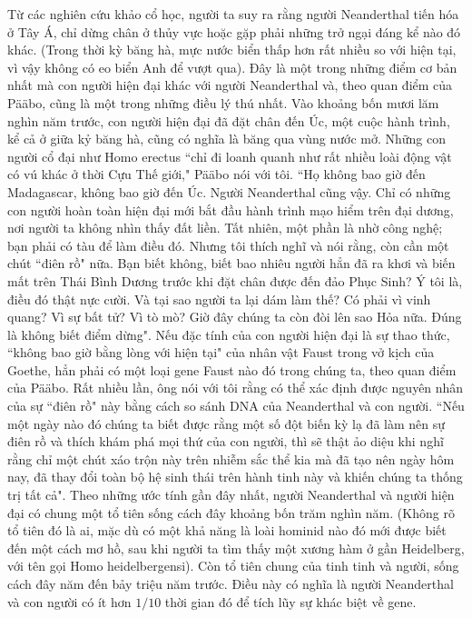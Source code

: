 \begin{multicols}{2}
	Từ các nghiên cứu khảo cổ học, người ta suy ra rằng người Neanderthal tiến hóa ở Tây Á, chỉ dừng chân ở thủy vực hoặc gặp phải những trở ngại đáng kể nào đó khác. (Trong thời kỳ băng hà, mực nước biển thấp hơn rất nhiều so với hiện tại, vì vậy không có eo biển Anh để vượt qua). Đây là một trong những điểm cơ bản nhất mà con người hiện đại khác với người Neanderthal và, theo quan điểm của Pääbo, cũng là một trong những điều lý thú nhất. Vào khoảng bốn mươi lăm nghìn năm trước, con người hiện đại đã đặt chân đến Úc, một cuộc hành trình, kể cả ở giữa kỷ băng hà, cũng có nghĩa là băng qua vùng nước mở. Những con người cổ đại như Homo erectus ``chỉ đi loanh quanh như rất nhiều loài động vật có vú khác ở thời Cựu Thế giới," Pääbo nói với tôi. ``Họ không bao giờ đến Madagascar, không bao giờ đến Úc. Người Neanderthal cũng vậy. Chỉ có những con người hoàn toàn hiện đại mới bắt đầu hành trình mạo hiểm trên đại dương, nơi người ta không nhìn thấy đất liền. Tất nhiên, một phần là nhờ công nghệ; bạn phải có tàu để làm điều đó. Nhưng tôi thích nghĩ và nói rằng, còn cần một chút ``điên rồ" nữa. Bạn biết không, biết bao nhiêu người hẳn đã ra khơi và biến mất trên Thái Bình Dương trước khi đặt chân được đến đảo Phục Sinh? Ý tôi là, điều đó thật nực cười. Và tại sao người ta lại dám làm thế? Có phải vì vinh quang? Vì sự bất tử? Vì tò mò? Giờ đây chúng ta còn đòi lên sao Hỏa nữa. Đúng là không biết điểm dừng". Nếu đặc tính của con người hiện đại là sự thao thức, ``không bao giờ bằng lòng với hiện tại" của nhân vật Faust trong vở kịch của Goethe, hẳn phải có một loại gene Faust nào đó trong chúng ta, theo quan điểm của Pääbo. Rất nhiều lần, ông nói với tôi rằng có thể xác định được nguyên nhân của sự ``điên rồ" này bằng cách so sánh DNA của Neanderthal và con người.
	\vskip 0.1cm
	``Nếu một ngày nào đó chúng ta biết được rằng một số đột biến kỳ lạ đã làm nên sự điên rồ và thích khám phá mọi thứ của con người, thì sẽ thật ảo diệu khi nghĩ rằng chỉ một chút xáo trộn này trên nhiễm sắc thể kia mà đã tạo nên ngày hôm nay, đã thay đổi toàn bộ hệ sinh thái trên hành tinh này và khiến chúng ta thống trị tất cả".
	\vskip 0.2cm
	\vskip 0.2cm
	Theo những ước tính gần đây nhất, người Neanderthal và người hiện đại có chung một tổ tiên sống cách đây khoảng bốn trăm nghìn năm. (Không rõ tổ tiên đó là ai, mặc dù có một khả năng là loài hominid nào đó mới được biết đến một cách mơ hồ, sau khi người ta tìm thấy một xương hàm ở gần Heidelberg, với tên gọi Homo heidelbergensi). Còn tổ tiên chung của tinh tinh và người, sống cách đây năm đến bảy triệu năm trước. Điều này có nghĩa là người Neanderthal và con người có ít hơn $1/10$ thời gian đó để tích lũy sự khác biệt về gene.

\end{multicols}
